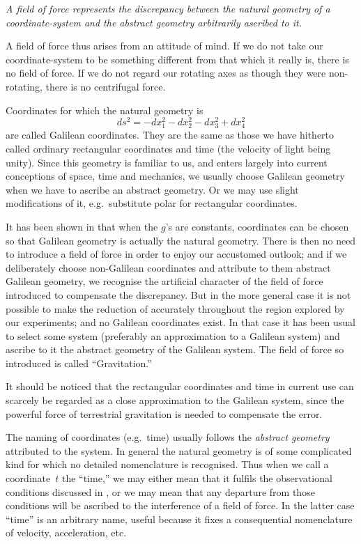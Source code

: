 \documentclass[12pt]{book}
\begin{document}
\emph{A field of force represents the discrepancy between the natural geometry of
a coordinate\hyp{}system and the abstract geometry arbitrarily ascribed to it.}

A field of force thus arises from an attitude of mind. If we do not take
our coordinate\hyp{}system to be something different from that which it really is,
there is no field of force. If we do not regard our rotating axes as though
they were non\hyp{}rotating, there is no centrifugal force.

Coordinates for which the natural geometry is
\[
ds^2 = - dx_1^2 - dx_2^2 - dx_3^2 + dx_4^2
\]
are called Galilean coordinates. They are the same as those we have hitherto
%
%
called ordinary rectangular coordinates and time (the velocity of light being
unity). Since this geometry is familiar to us, and enters largely into current
conceptions of space, time and mechanics, we usually choose Galilean geometry
when we have to ascribe an abstract geometry. Or we may use slight modifications
of it, e.g.\ substitute polar for rectangular coordinates.

It has been shown in  that when the $g$'s are constants, coordinates can
be chosen so that Galilean geometry is actually the natural geometry. There
is then no need to introduce a field of force in order to enjoy our accustomed
outlook; and if we deliberately choose non\hyp{}Galilean coordinates and attribute
to them abstract Galilean geometry, we recognise the artificial character of
the field of force introduced to compensate the discrepancy. But in the more
general case it is not possible to make the reduction of  accurately throughout
the region explored by our experiments; and no Galilean coordinates
exist. In that case it has been usual to select some system (preferably an
approximation to a Galilean system) and ascribe to it the abstract geometry
of the Galilean system. The field of force so introduced is called ``Gravitation.''
%

It should be noticed that the rectangular coordinates and time in current
%
use can scarcely be regarded as a close approximation to the Galilean system,
since the powerful force of terrestrial gravitation is needed to compensate
the error.

The naming of coordinates (e.g.\ time) usually follows the \emph{abstract geometry}
attributed to the system. In general the natural geometry is of some complicated
kind for which no detailed nomenclature is recognised. Thus when we
call a coordinate~$t$ the ``time,'' we may either mean that it fulfils the
observational conditions discussed in , or we may mean that any departure
from those conditions will be ascribed to the interference of a field of force.
In the latter case ``time'' is an arbitrary name, useful because it fixes a
consequential nomenclature of velocity, acceleration, etc.
\end{document}
